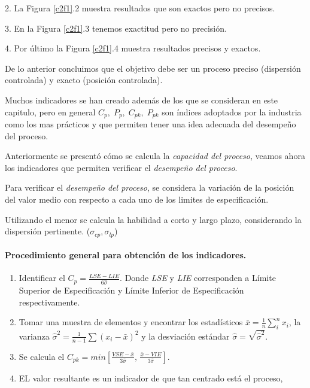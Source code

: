 \documentclass[english]{report}
\begin{document}
2. La Figura \ref{c2f1}.2 muestra resultados que son exactos pero no precisos.

3. En la Figura \ref{c2f1}.3 tenemos exactitud pero no precisión.

4. Por último la Figura \ref{c2f1}.4 muestra resultados precisos y exactos.

De lo anterior concluimos que el objetivo debe ser un proceso preciso (dispersión controlada) y exacto (posición controlada).

Muchos indicadores se han creado además de los que se consideran en
este capitulo, pero en general $C_{p},\;P_{p},\;C_{pk},\;P_{pk}$
son índices adoptados por la industria como los mas prácticos y que
permiten tener una idea adecuada del desempeño del proceso.

Anteriormente se presentó cómo se calcula la \emph{capacidad del proceso},
veamos ahora los indicadores que permiten verificar el \emph{desempeño
del proceso}.

Para verificar el \emph{desempeño del proceso}, se considera la variación
de la posición del valor medio con respecto a cada uno de los
limites de especificación.

Utilizando el menor se calcula la habilidad a corto y largo plazo, considerando la dispersión
pertinente. ($\sigma_{cp}$,\,$\sigma_{lp}$)


\paragraph{\textmd{Procedimiento general para obtención de los indicadores.}}

\begin{enumerate}
\item Identificar el $C_{p}=\frac{LSE-LIE}{6\hat{\sigma}}$. Donde \emph{LSE}
y \emph{LIE} corresponden a Límite Superior de Especificación y Límite
Inferior de Especificación respectivamente.
\item Tomar una muestra de elementos y encontrar los estadísticos $\bar{x}=\frac{1}{n}\sum_{i}^{n}x_{i}$,
la varianza $\hat{\sigma}^{2}=\frac{1}{n-1}\sum(x_{i}-\bar{x})^{2}$ y la desviación
estándar $\hat{\sigma}=\sqrt{\hat{\sigma}^{2}}$.
\item Se calcula el $C_{pk}=min\left[\frac{VSE-\bar{x}}{3\hat{\sigma}},\,\frac{\bar{x}-VIE}{3\hat{\sigma}}\right]$.
\item EL valor resultante es un indicador de que tan centrado está el proceso,
\end{enumerate}
\end{document}
